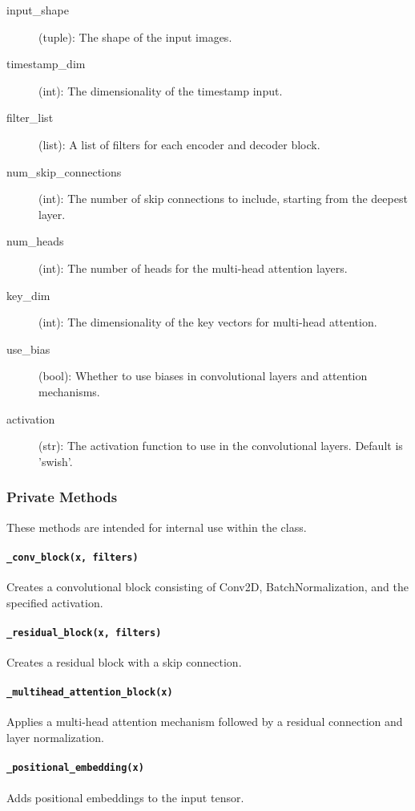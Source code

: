 \documentclass{article}
\begin{document}
	\begin{description}
		\item[input\_shape] (tuple): The shape of the input images.
		\item[timestamp\_dim] (int): The dimensionality of the timestamp input.
		\item[filter\_list] (list): A list of filters for each encoder and decoder block.
		\item[num\_skip\_connections] (int): The number of skip connections to include, starting from the deepest layer.
		\item[num\_heads] (int): The number of heads for the multi-head attention layers.
		\item[key\_dim] (int): The dimensionality of the key vectors for multi-head attention.
		\item[use\_bias] (bool): Whether to use biases in convolutional layers and attention mechanisms.
		\item[activation] (str): The activation function to use in the convolutional layers. Default is 'swish'.
	\end{description}
	
	\subsubsection*{Private Methods}
	These methods are intended for internal use within the class.
	
	\paragraph*{\texttt{\_conv\_block(x, filters)}}
	Creates a convolutional block consisting of Conv2D, BatchNormalization, and the specified activation.
	
	\paragraph*{\texttt{\_residual\_block(x, filters)}}
	Creates a residual block with a skip connection.
	
	\paragraph*{\texttt{\_multihead\_attention\_block(x)}}
	Applies a multi-head attention mechanism followed by a residual connection and layer normalization.
	
	\paragraph*{\texttt{\_positional\_embedding(x)}}
	Adds positional embeddings to the input tensor.
	
\end{document}
